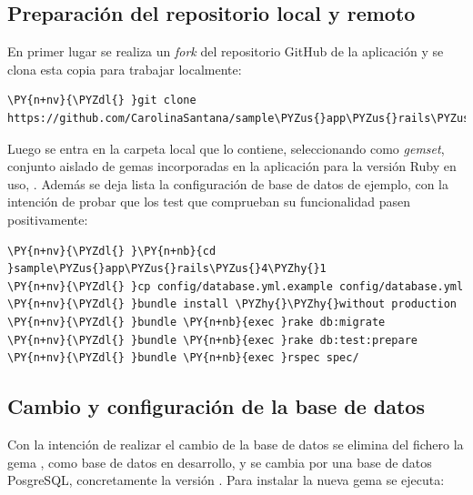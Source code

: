 \subsection{Preparación del repositorio local y remoto}

En primer lugar se realiza un \textit{fork} del repositorio GitHub de la aplicación  y se clona esta copia para trabajar localmente:

\begin{framed_shaded}
\begin{Verbatim}[fontsize=\relsize{-2.5},fontseries=b,commandchars=\\\{\}]
\PY{n+nv}{\PYZdl{} }git clone https://github.com/CarolinaSantana/sample\PYZus{}app\PYZus{}rails\PYZus{}4\PYZhy{}1.git 
\end{Verbatim}
\end{framed_shaded}

Luego se entra en la carpeta local que lo contiene, seleccionando como \textit{gemset}, conjunto aislado de gemas incorporadas en la aplicación para la versión Ruby en uso, . Además se deja lista la configuración de base de datos de ejemplo, con la intención de probar que los test que comprueban su funcionalidad pasen positivamente: 

\begin{framed_shaded}
\begin{Verbatim}[fontsize=\relsize{-2.5},fontseries=b,commandchars=\\\{\}]
\PY{n+nv}{\PYZdl{} }\PY{n+nb}{cd }sample\PYZus{}app\PYZus{}rails\PYZus{}4\PYZhy{}1
\PY{n+nv}{\PYZdl{} }cp config/database.yml.example config/database.yml
\PY{n+nv}{\PYZdl{} }bundle install \PYZhy{}\PYZhy{}without production
\PY{n+nv}{\PYZdl{} }bundle \PY{n+nb}{exec }rake db:migrate
\PY{n+nv}{\PYZdl{} }bundle \PY{n+nb}{exec }rake db:test:prepare
\PY{n+nv}{\PYZdl{} }bundle \PY{n+nb}{exec }rspec spec/
\end{Verbatim}
\end{framed_shaded}

\subsection{Cambio y configuración de la base de datos} \label{postgrescredentials}

Con la intención de realizar el cambio de la base de datos se elimina del fichero  la gema , como base de datos en desarrollo, y se cambia por una base de datos PosgreSQL, concretamente la versión . Para instalar la nueva gema se ejecuta:

